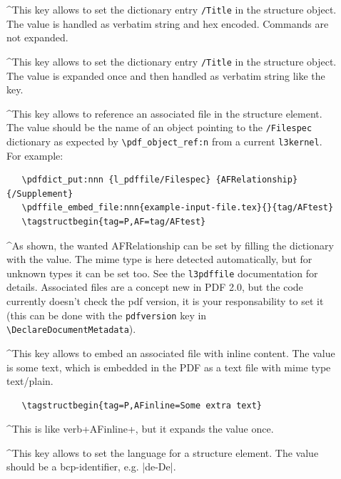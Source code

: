\documentclass[DIV=12,parskip=half-,bibliography=totoc]{scrartcl}
\begin{document}
\begin{description}
  \item[]
  \TagP^This key allows to set the dictionary entry \texttt{/Title} in the structure object. The value is handled as verbatim string and hex encoded. Commands are not expanded.\Pmeti

  \item[]
  \TagP^This key allows to set the dictionary entry \texttt{/Title} in the structure object.
  The value is expanded once and then handled as verbatim string like the  key.\Pmeti

   \item[]
   \TagP^This key allows to reference an associated file in the structure element.
   The value should be the name of an object pointing to the \texttt{/Filespec} dictionary as expected by
   \verb+\pdf_object_ref:n+ from a current \texttt{l3kernel}.
   For example:\TagPend

   \begin{lstlisting}
   \pdfdict_put:nnn {l_pdffile/Filespec} {AFRelationship}{/Supplement}
   \pdffile_embed_file:nnn{example-input-file.tex}{}{tag/AFtest}
   \tagstructbegin{tag=P,AF=tag/AFtest}
   \end{lstlisting}

   \TagP^As shown, the wanted AFRelationship can be set
   by filling the dictionary with the value. The mime type
   is here detected automatically, but for unknown types it can be set too.
   See the \texttt{l3pdffile} documentation for details.  Associated files are
   a concept new in PDF 2.0, but the code currently doesn't check the pdf version, it is your responsability
   to set it (this can be done with the \texttt{pdfversion} key in \verb+\DeclareDocumentMetadata+). \Pmeti

   \item[]
    \TagP^This key allows to embed an associated file with inline content. The value is some text,
    which is embedded in the PDF as a text file with mime type text/plain. \Pmeti

   \begin{lstlisting}
   \tagstructbegin{tag=P,AFinline=Some extra text}
   \end{lstlisting}

   \item[]
    \TagP^This is like verb+AFinline+, but it expands the value once.\Pmeti

   \item[]
     \TagP^This key allows to set the language for a structure element. The value should be a bcp-identifier,
     e.g. |de-De|.\Pmeti


\end{description}
\end{document}
